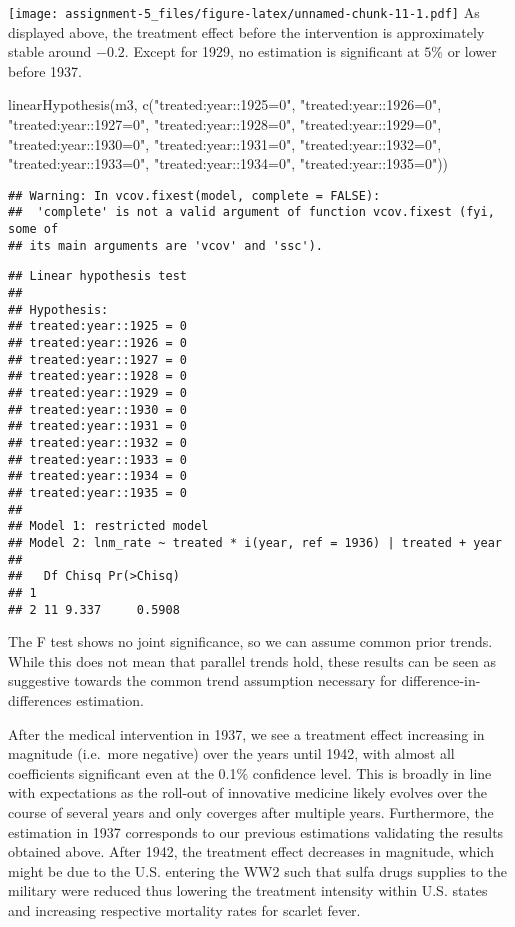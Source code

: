 \documentclass[
]{article}
\newenvironment{Shaded}{\begin{snugshade}}{\end{snugshade}}
\newcommand{\FunctionTok}[1]{\textcolor[rgb]{0.00,0.00,0.00}{#1}}
\newcommand{\NormalTok}[1]{#1}
\newcommand{\StringTok}[1]{\textcolor[rgb]{0.31,0.60,0.02}{#1}}
\begin{document}
\texttt{[image: assignment-5\_files/figure-latex/unnamed-chunk-11-1.pdf]}
As displayed above, the treatment effect before the intervention is
approximately stable around \(-0.2\). Except for 1929, no estimation is
significant at \(5\%\) or lower before 1937.

\begin{Shaded}
\begin{Highlighting}[]
\FunctionTok{linearHypothesis}\NormalTok{(m3, }\FunctionTok{c}\NormalTok{(}\StringTok{"treated:year::1925=0"}\NormalTok{, }\StringTok{"treated:year::1926=0"}\NormalTok{, }\StringTok{"treated:year::1927=0"}\NormalTok{, }\StringTok{"treated:year::1928=0"}\NormalTok{, }
                                  \StringTok{"treated:year::1929=0"}\NormalTok{, }\StringTok{"treated:year::1930=0"}\NormalTok{, }\StringTok{"treated:year::1931=0"}\NormalTok{, }\StringTok{"treated:year::1932=0"}\NormalTok{, }\StringTok{"treated:year::1933=0"}\NormalTok{, }\StringTok{"treated:year::1934=0"}\NormalTok{, }\StringTok{"treated:year::1935=0"}\NormalTok{))}
\end{Highlighting}
\end{Shaded}

\begin{verbatim}
## Warning: In vcov.fixest(model, complete = FALSE):
##  'complete' is not a valid argument of function vcov.fixest (fyi, some of
## its main arguments are 'vcov' and 'ssc').
\end{verbatim}

\begin{verbatim}
## Linear hypothesis test
## 
## Hypothesis:
## treated:year::1925 = 0
## treated:year::1926 = 0
## treated:year::1927 = 0
## treated:year::1928 = 0
## treated:year::1929 = 0
## treated:year::1930 = 0
## treated:year::1931 = 0
## treated:year::1932 = 0
## treated:year::1933 = 0
## treated:year::1934 = 0
## treated:year::1935 = 0
## 
## Model 1: restricted model
## Model 2: lnm_rate ~ treated * i(year, ref = 1936) | treated + year
## 
##   Df Chisq Pr(>Chisq)
## 1                    
## 2 11 9.337     0.5908
\end{verbatim}

The F test shows no joint significance, so we can assume common prior
trends. While this does not mean that parallel trends hold, these
results can be seen as suggestive towards the common trend assumption
necessary for difference-in-differences estimation.

After the medical intervention in 1937, we see a treatment effect
increasing in magnitude (i.e.~more negative) over the years until 1942,
with almost all coefficients significant even at the 0.1\(\%\)
confidence level. This is broadly in line with expectations as the
roll-out of innovative medicine likely evolves over the course of
several years and only coverges after multiple years. Furthermore, the
estimation in 1937 corresponds to our previous estimations validating
the results obtained above. After 1942, the treatment effect decreases
in magnitude, which might be due to the U.S. entering the WW2 such that
sulfa drugs supplies to the military were reduced thus lowering the
treatment intensity within U.S. states and increasing respective
mortality rates for scarlet fever.
\end{document}
